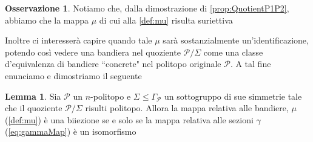 \documentclass[a4paper,12pt]{report}
\newcommand{\p}{\mathcal{P}}
\theoremstyle{plain}
\theoremstyle{definition}
\newtheorem{lem}[teo]{Lemma}
\newtheorem{oss}[teo]{Osservazione}
\begin{document}
\begin{oss}
Notiamo che, dalla dimostrazione di \ref{prop:QuotientP1P2}, abbiamo che la mappa $\mu$ di cui alla \ref{def:mu} risulta suriettiva
\end{oss}
Inoltre ci interesser\`a capire quando tale $\mu$ sar\`a sostanzialmente un'identificazione, potendo cos\`i vedere una bandiera nel quoziente
$\p/\Sigma$ come una classe d'equivalenza di bandiere ``concrete" nel politopo originale $\p$. A tal fine enunciamo e dimostriamo il seguente
\begin{lem}
\label{lem:QuotientFlags}
Sia $\p$ un $n$-politopo e $\Sigma\leq\Gamma_\p$ un sottogruppo di sue simmetrie tale che il quoziente $\p/\Sigma$ risulti politopo. Allora
la mappa relativa alle bandiere, $\mu$ (\ref{def:mu}) \`e una biiezione se e solo se la mappa relativa alle sezioni $\gamma$ (\ref{eq:gammaMap}) \`e
un isomorfismo
\end{lem}
\end{document}
